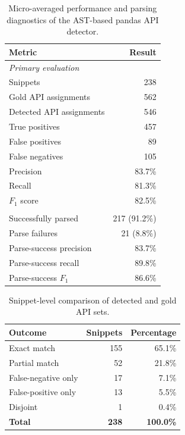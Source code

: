 \begin{table}[htbp]
    \centering
    \caption{Micro-averaged performance and parsing diagnostics of the
    AST-based pandas API detector.}
    \label{tab:ast-api-level}
    \begin{tabular}{lr}
        \toprule
        Metric & Result \\
        \midrule
        \multicolumn{2}{l}{\textit{Primary evaluation}} \\
        Snippets                 & 238 \\
        Gold API assignments     & 562 \\
        Detected API assignments & 546 \\
        True positives           & 457 \\
        False positives          & 89 \\
        False negatives          & 105 \\
        Precision                & 83.7\% \\
        Recall                   & 81.3\% \\
        $F_1$ score              & 82.5\% \\
        \addlinespace
        \multicolumn{2}{l}{\textit{Parsing diagnostics}} \\
        Successfully parsed      & 217 (91.2\%) \\
        Parse failures           & 21 (8.8\%) \\
        Parse-success precision  & 83.7\% \\
        Parse-success recall     & 89.8\% \\
        Parse-success $F_1$      & 86.6\% \\
        \bottomrule
    \end{tabular}
\end{table}

\begin{table}[htbp]
    \centering
    \caption{Snippet-level comparison of detected and gold API sets.}
    \label{tab:ast-set-matching}
    \begin{tabular}{lrr}
        \toprule
        Outcome & Snippets & Percentage \\
        \midrule
        Exact match         & 155 & 65.1\% \\
        Partial match       & 52  & 21.8\% \\
        False-negative only & 17  & 7.1\% \\
        False-positive only & 13  & 5.5\% \\
        Disjoint            & 1   & 0.4\% \\
        \midrule
        \textbf{Total} & \textbf{238} & \textbf{100.0\%} \\
        \bottomrule
    \end{tabular}
\end{table}
